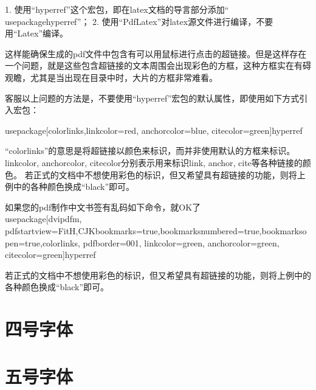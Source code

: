 \documentclass[11pt,a4paper]{article}
\newcommand{\wuhao}{\fontsize{10.5pt}{10.5pt}\selectfont}
\begin{document}
1. 使用“hyperref”这个宏包，即在latex文档的导言部分添加“\\usepackage{hyperref}”；
2. 使用“PdfLatex”对latex源文件进行编译，不要用“Latex”编译。

 

这样能确保生成的pdf文件中包含有可以用鼠标进行点击的超链接。但是这样存在一个问题，就是这些包含超链接的文本周围会出现彩色的方框，这种方框实在有碍观瞻，尤其是当出现在目录中时，大片的方框非常难看。

客服以上问题的方法是，不要使用“hyperref”宏包的默认属性，即使用如下方式引入宏包：

 usepackage[colorlinks,linkcolor=red, anchorcolor=blue, citecolor=green]{hyperref}

“colorlinks”的意思是将超链接以颜色来标识，而并非使用默认的方框来标识。
linkcolor, anchorcolor, citecolor分别表示用来标识link, anchor, cite等各种链接的颜色。
若正式的文档中不想使用彩色的标识，但又希望具有超链接的功能，则将上例中的各种颜色换成“black”即可。

如果您的pdf制作中文书签有乱码如下命令，就OK了
\\usepackage[dvipdfm,  pdfstartview=FitH,CJKbookmarks=true,bookmarksnumbered=true,bookmarksopen=true,colorlinks, pdfborder=001, linkcolor=green,  anchorcolor=green, citecolor=green]{hyperref}

 若正式的文档中不想使用彩色的标识，但又希望具有超链接的功能，则将上例中的各种颜色换成“black”即可。
 


\section{四号字体}
\wuhao {四号
“书籍是世界珍贵的财富，是世世代代和一切国家最好的继承。最古老和最优秀的书籍自然而然地、合情合理地占据着每一所房子里的书架。它们没有自己的利益与诉求，但是在它们给读者以启迪和激励的时候，读者的常识使他不会拒绝书籍。在任何一个社会中，书籍的作者者是天生的极富魅力的精英分子，对人类发挥着比帝王们更大的影响 。当目不识丁的、也许还是鄙视一切的商人，通过魄力和勤奋挣得了垂涎已久的闲暇和衣食无忧的生活，进入了财富和时尚的圈子 以后，最终不可避免地会转向那更高的然而却难以企及的知识和财富的圈子，这时他才会意识到自己文化的残缺，以及他一切财富的空虚无用；于是他不遗余力地要使子女获得知识文化，他深刻地感到自己这方面的不足，从而证明了他的明智；就这样，他成了一个家族的缔造者。”}
\section{五号字体}
\end{document}
